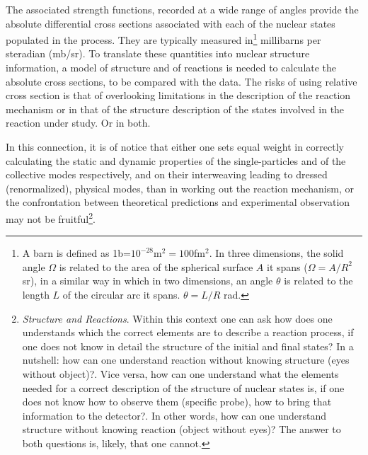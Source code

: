 The associated strength functions, recorded at a wide range of angles provide the absolute differential cross sections associated with each of the nuclear states populated in the process. They are  typically measured in\footnote{A barn is defined as 1b=$10^{-28}$m$^2=100$fm$^2$. In three dimensions, the solid angle $\Omega$ is related to the area of the spherical surface $A$ it spans ($\Omega=A/R^2$ sr), in a similar way in which in two dimensions, an angle $\theta$ is related to the length $L$ of the circular arc it spans. $\theta=L/R$ rad.} millibarns per  steradian (mb/sr). To translate these quantities into nuclear structure information, a model of structure and of reactions is needed to calculate the absolute cross sections, to be compared with the data. The risks of using relative cross section is that of overlooking limitations in the description of the reaction mechanism or in that of the structure description of the states involved in the reaction under study. Or in both.

In this connection, it is of notice that either one sets equal weight in correctly calculating the static and dynamic   properties  of the single-particles and of the collective modes respectively, and on their interweaving leading to dressed (renormalized), physical modes, than in working out the reaction mechanism, or the confrontation between theoretical predictions and experimental observation may not be fruitful\footnote{\textit{Structure and Reactions}. Within this context one can ask how does one understands which the correct elements are to describe a reaction process, if one does not know in detail the structure of the initial and final states? In a nutshell: how can one understand reaction without knowing structure (eyes without object)?. 
Vice versa, how can one understand what the elements needed for a correct description of the structure of nuclear states is, if one does not know how to observe them (specific probe), how to bring that information to the detector?. In other words, how can one understand structure without knowing reaction (object without eyes)? The answer to both questions is, likely, that one cannot.}.

